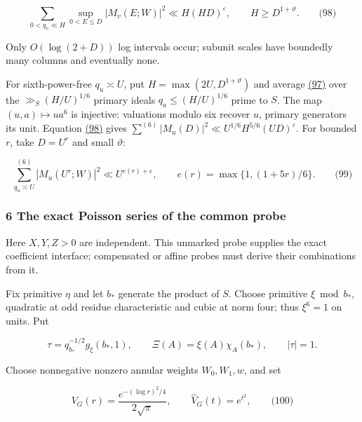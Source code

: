 \hypertarget{cf:eq:3.5}{}

\label{cf:eq:3.5}

\[
\sum_{0<q_v\ll H}\sup_{0<E\le D}|M_v(E;W)|^2\ll H(HD)^\varepsilon,
 \qquad H\ge D^{1+\vartheta}.
\qquad\text{(98)}
\]

Only \(O(\log(2+D))\) log intervals occur; subunit scales have boundedly many columns and eventually none.

For sixth-power-free \(q_u\asymp U\), put \(H=\max(2U,D^{1+\vartheta})\) and average \protect\hyperlink{cf:eq:3.4}{(97)} over the \(\gg_S(H/U)^{1/6}\) primary ideals \(q_a\le(H/U)^{1/6}\) prime to \(S\). The map \((u,a)\mapsto ua^6\) is injective: valuations modulo six recover \(u\), primary generators its unit. Equation \protect\hyperlink{cf:eq:3.5}{(98)} gives \(\sum^{(6)}|M_u(D)|^2\ll U^{1/6}H^{5/6}(UD)^\varepsilon\). For bounded \(r\), take \(D=U^r\) and small \(\vartheta\):

\hypertarget{cf:eq:3.6}{}

\label{cf:eq:3.6}

\[
\sum_{q_u\asymp U}^{(6)}|M_u(U^r;W)|^2
 \ll U^{e(r)+\varepsilon},\qquad e(r)=\max\{1,(1+5r)/6\}.
\qquad\text{(99)}
\]

\hypertarget{cf:probe-arithmetic}{}

\label{cf:probe-arithmetic}

\hypertarget{the-exact-poisson-series-of-the-common-probe}{%
\subsubsection{6 The exact Poisson series of the common probe}\label{the-exact-poisson-series-of-the-common-probe}}

Here \(X,Y,Z>0\) are independent. This unmarked probe supplies the exact coefficient interface; compensated or affine probes must derive their combinations from it.

Fix primitive \(\eta\) and let \(b_*\) generate the product of \(S\). Choose primitive \(\xi\bmod b_*\), quadratic at odd residue characteristic and cubic at norm four; thus \(\xi^6=1\) on units. Put

\[
\tau=q_{b_*}^{-1/2}g_\xi(b_*,1),\qquad
 \Xi(A)=\xi(A)\chi_A(b_*),\qquad |\tau|=1.
\]

Choose nonnegative nonzero annular weights \(W_0,W_1,w\), and set

\hypertarget{cf:eq:2.2}{}

\label{cf:eq:2.2}

\[
V_G(r)=\frac{e^{-(\log r)^2/4}}{2\sqrt\pi},\qquad \widehat V_G(t)=e^{t^2},
\qquad\text{(100)}
\]

